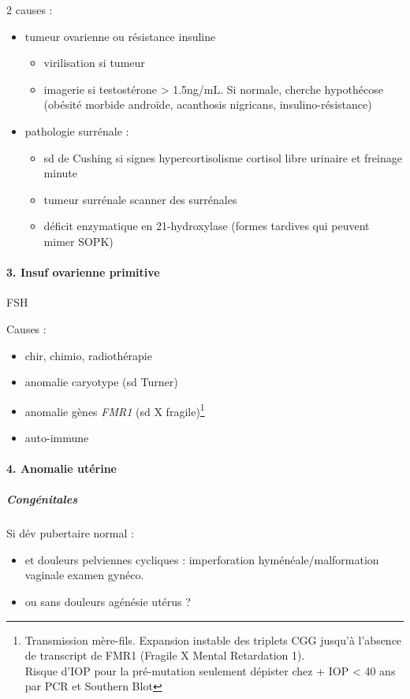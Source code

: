 \documentclass[11pt]{article}
\begin{document}
2 causes :
\begin{itemize}
\item tumeur ovarienne ou résistance insuline
\begin{itemize}
\item virilisation si tumeur
\item imagerie si testostérone > 1.5ng/mL. Si normale, cherche hypothécose
(obésité morbide androïde, acanthosis nigricans, insulino-résistance)
\end{itemize}
\item pathologie surrénale :
\begin{itemize}
\item sd de Cushing si signes hypercortisolisme \thus cortisol libre urinaire et
freinage minute
\item tumeur surrénale \thus scanner des surrénales
\item déficit enzymatique en 21-hydroxylase (\danger formes tardives qui peuvent
mimer SOPK)
\end{itemize}
\end{itemize}

\paragraph{3. Insuf ovarienne primitive}
\label{sec:orgaaabeb6}
\inc FSH

Causes :
\begin{itemize}
\item chir, chimio, radiothérapie
\item anomalie caryotype (sd Turner)
\item anomalie gènes \emph{FMR1} (sd X fragile)\footnote{Transmission mère-fils. Expansion instable des triplets CGG jusqu'à
l'absence de transcript de FMR1 (Fragile X Mental Retardation 1). \\
\danger Risque d'IOP pour la pré-mutation seulement \thus dépister chez
\female + IOP < 40 ans par PCR et Southern Blot}
\item auto-immune
\end{itemize}

\paragraph{4. Anomalie utérine}
\label{sec:orgc6d03d2}
\subparagraph{Congénitales}
\label{sec:orgbf75a60}
Si dév pubertaire normal :
\begin{itemize}
\item et douleurs pelviennes cycliques :  imperforation hyménéale/malformation vaginale \thus examen gynéco.
\item ou sans douleurs \thus agénésie utérus ?
\end{itemize}
\end{document}
